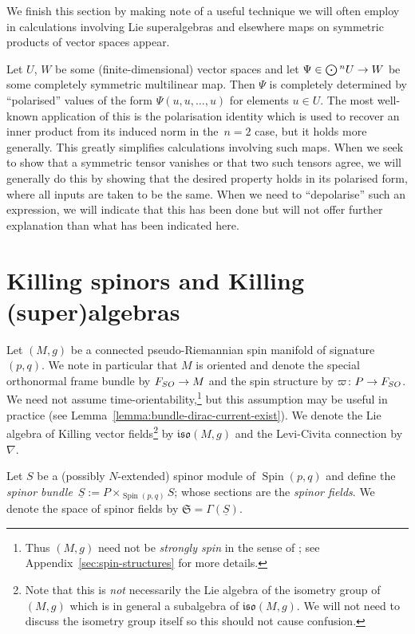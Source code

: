 \documentclass[11pt]{article}
\numberwithin{equation}{section}
\numberwithin{equation}{section}
\newcommand{\fiso}{\mathfrak{iso}}
\newcommand{\fS}{\mathfrak{S}}
\newcommand{\Sbundle}{\underline{S}}
\newcommand{\Odot}{\mathchoice{{\textstyle\bigodot}}{\bigodot}{\bigodot}{\bigodot}}
\newcommand{\1}{\mathbbm{1}}
\DeclareMathOperator{\Spin}{Spin}
\begin{document}
We finish this section by making note of a useful technique we will often employ in calculations involving Lie superalgebras and elsewhere maps on symmetric products of vector spaces appear.

Let $U$, $W$ be some (finite-dimensional) vector spaces and let $\Psi\in\Odot^n U\to W$ be some completely symmetric multilinear map. Then $\Psi$ is completely determined by ``polarised'' values of the form $\Psi(u,u,\dots,u)$ for elements $u\in U$. The most well-known application of this is the polarisation identity which is used to recover an inner product from its induced norm in the~${n=2}$ case, but it holds more generally. This greatly simplifies calculations involving such maps. When we seek to show that a symmetric tensor vanishes or that two such tensors agree, we will generally do this by showing that the desired property holds in its polarised form, where all inputs are taken to be the same. When we need to ``depolarise'' such an expression, we will indicate that this has been done but will not offer further explanation than what has been indicated here.

\section{Killing spinors and Killing (super)algebras}
\label{sec:killing-spinors-superalgebras}

Let $(M,g)$ be a connected pseudo-Riemannian spin manifold of signature $(p,q)$. We note in particular that $M$ is oriented and denote the special orthonormal frame bundle by $F_{\rm SO}\to M$ and the spin structure by $\varpi\colon P\to F_{\rm SO}$. We need not assume time-orientability,\footnote{Thus $(M,g)$ need not be \emph{strongly spin} in the sense of \cite{Cortes2021,Shahbazi2024_2,Shahbazi2024_1}; see Appendix~\ref{sec:spin-structures} for more details.}
but this assumption may be useful in practice (see Lemma~\ref{lemma:bundle-dirac-current-exist}).
We denote the Lie algebra of Killing vector fields\footnote{Note that this is \emph{not} necessarily the Lie algebra of the isometry group of $(M,g)$ which is in general a subalgebra of $\fiso(M,g)$. We will not need to discuss the isometry group itself so this should not cause confusion.}
by $\fiso(M,g)$ and the Levi-Civita connection by $\nabla$.

Let $S$ be a (possibly $N$-extended) spinor module of $\Spin(p,q)$ and define the \emph{spinor bundle}~${\Sbundle:=P\times_{\Spin(p,q)} S}$; whose sections are the \emph{spinor fields}. We denote the space of spinor fields by $\fS=\Gamma(\Sbundle)$.
\end{document}
